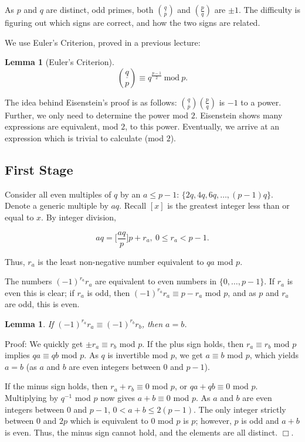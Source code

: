 \documentclass[12pt,letterpaper]{report}
\newcommand\be{\begin{equation}}
\newcommand\ee{\end{equation}}
\newcommand\lag[2]{\ensuremath{\left(\frac{#1}{#2}\right)}}
\newcommand{\js}[1]{ { \underline{#1} \choose p} }
\newtheorem{lem}[thm]{Lemma}
\begin{document}
As $p$ and $q$ are distinct, odd primes, both $\js{q}$ and
$\lag{p}{q}$ are $\pm 1$. The difficulty is figuring out which
signs are correct, and how the two signs are related.

We use Euler's Criterion, proved in a previous lecture:

\begin{lem}[Euler's Criterion]
\be \js{q} \equiv q^{\frac{p-1}{2}} \ \mbox{mod} \ p. \ee
\end{lem}

The idea behind Eisenstein's proof is as follows: $\js{q}
\lag{p}{q}$ is $-1$ to a power. Further, we only need to determine
the power mod $2$. Eisenstein shows many expressions are
equivalent, mod $2$, to this power. Eventually, we arrive at an
expression which is trivial to calculate (mod $2$).


\subsection{First Stage}

Consider all even multiples of $q$ by an $a \le p-1$: $\{2q, 4q,
6q, \dots, (p-1)q\}$. Denote a generic multiple by $aq$. Recall
$[x]$ is the greatest integer less than or equal to $x$. By
integer division,

\be aq = \Bigg[\frac{aq}{p}\Bigg]p + r_a, \ 0 \le r_a < p-1. \ee

Thus, $r_a$ is the least non-negative number equivalent to $qa$
mod $p$.

The numbers $(-1)^{r_a} r_a$ are equivalent to even numbers in
$\{0,\dots,p-1\}$. If $r_a$ is even this is clear; if $r_a$ is
odd, then $(-1)^{r_a} r_a \equiv p - r_a$ mod $p$, and as $p$ and
$r_a$ are odd, this is even.

\begin{lem} If $(-1)^{r_a} r_a \equiv (-1)^{r_b} r_b$, then $a =
b$. \end{lem}

Proof: We quickly get $\pm r_a \equiv r_b$ mod $p$. If the plus
sign holds, then $r_a \equiv r_b$ mod $p$ implies $qa \equiv qb$
mod $p$. As $q$ is invertible mod $p$, we get $a \equiv b$ mod
$p$, which yields $a = b$ (as $a$ and $b$ are even integers
between $0$ and $p-1$).

If the minus sign holds, then $r_a + r_b \equiv 0$ mod $p$, or $qa
+ qb \equiv 0$ mod $p$. Multiplying by $q^{-1}$ mod $p$ now gives
$a + b \equiv 0$ mod $p$. As $a$ and $b$ are even integers between
$0$ and $p-1$, $0 < a + b \le 2(p-1)$. The only integer strictly
between $0$ and $2p$ which is equivalent to $0$ mod $p$ is $p$;
however, $p$ is odd and $a+b$ is even. Thus, the minus sign cannot
hold, and the elements are all distinct. $\Box$.
\end{document}
